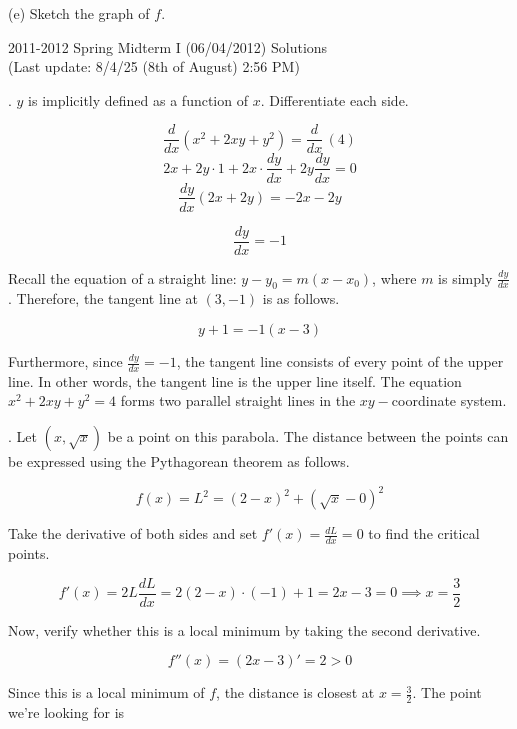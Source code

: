 \documentclass{article}
\begin{document}
\hfill

(e) Sketch the graph of $f$.

\newpage

\begin{center}
2011-2012 Spring Midterm I (06/04/2012) Solutions\\
(Last update: 8/4/25 (8th of August) 2:56 PM)
\end{center}

. $y$ is implicitly defined as a function of $x$. Differentiate each side.

\[\frac{d}{dx}\left(x^2+2xy+y^2\right)=\frac{d}{dx}\,(4)\]
\[2x+2y\cdot1+2x\cdot\frac{dy}{dx}+2y\frac{dy}{dx}=0\]
\[\frac{dy}{dx}(2x+2y)=-2x-2y\]

\[\frac{dy}{dx}=-1\]

\hfill

\noindent Recall the equation of a straight line: $y-y_0=m(x-x_0)$, where $m$ is simply $\displaystyle \frac{dy}{dx}$. Therefore, the tangent line at $(3,-1)$ is as follows.

\[\boxed{y+1=-1(x-3)}\]

\hfill

\noindent Furthermore, since $\displaystyle \frac{dy}{dx}=-1$, the tangent line consists of every point of the upper line. In other words, the tangent line is the upper line itself. The equation $x^2+2xy+y^2=4$ forms two parallel straight lines in the $xy-$coordinate system.

\hfill

. Let $(x,\sqrt x)$ be a point on this parabola. The distance between the points can be expressed using the Pythagorean theorem as follows.

\[f(x)=L^2=(2-x)^2 + (\sqrt x - 0)^2\]

\hfill

\noindent Take the derivative of both sides and set $\displaystyle f'(x)=\frac{dL}{dx} = 0$ to find the critical points.

\begin{equation*}
f'(x)=2L\frac{dL}{dx}=2(2-x)\cdot(-1) + 1 = 2x-3=0 \implies x=\frac{3}2
\end{equation*}

\hfill

\noindent Now, verify whether this is a local minimum by taking the second derivative.

\[f''(x)=(2x-3)'=2>0\]

\noindent Since this is a local minimum of $f$, the distance is closest at $\displaystyle x=\frac32$. The point we're looking for is
\end{document}
